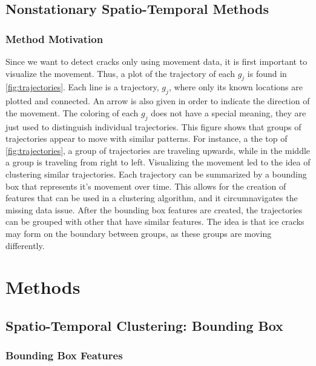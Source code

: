\documentclass[12pt]{article}
\begin{document}
\hypertarget{nonstationary-spatio-temporal-methods}{%
\subsection{Nonstationary Spatio-Temporal
Methods}\label{nonstationary-spatio-temporal-methods}}

\hypertarget{method-motivation}{%
\subsubsection{Method Motivation}\label{method-motivation}}

Since we want to detect cracks only using movement data, it is first
important to visualize the movement. Thus, a plot of the trajectory of
each \(g_j\) is found in \cref{fig:trajectories}. Each line is a
trajectory, \(g_j\), where only its known locations are plotted and
connected. An arrow is also given in order to indicate the direction of
the movement. The coloring of each \(g_j\) does not have a special
meaning, they are just used to distinguish individual trajectories. This
figure shows that groups of trajectories appear to move with similar
patterns. For instance, a the top of \cref{fig:trajectories}, a group of
trajectories are traveling upwards, while in the middle a group is
traveling from right to left. Visualizing the movement led to the idea
of clustering similar trajectories. Each trajectory can be summarized by
a bounding box that represents it's movement over time. This allows for
the creation of features that can be used in a clustering algorithm, and
it circumnavigates the missing data issue. After the bounding box
features are created, the trajectories can be grouped with other that
have similar features. The idea is that ice cracks may form on the
boundary between groups, as these groups are moving differently.

\hypertarget{methods}{%
\section{Methods}\label{methods}}

\hypertarget{spatio-temporal-clustering-bounding-box}{%
\subsection{Spatio-Temporal Clustering: Bounding
Box}\label{spatio-temporal-clustering-bounding-box}}

\hypertarget{bounding-box-features}{%
\subsubsection{Bounding Box Features}\label{bounding-box-features}}
\end{document}
